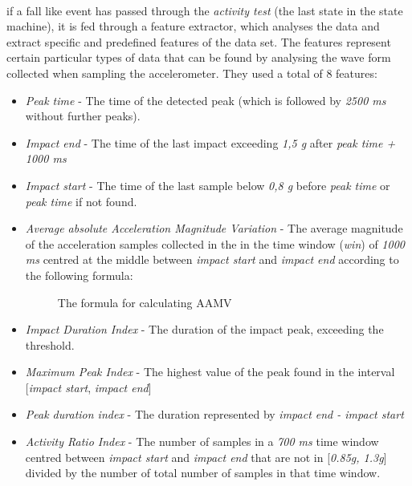 \documentclass[12pt, a4paper, onecolumn]{article}
\begin{document}
	
	
	\paragraph{} if a fall like event has passed through the  \textit{activity test} (the last state in the state machine), it is fed through a feature extractor, which analyses the data and extract specific and predefined features of the data set. The features represent certain particular types of data that can be found by analysing the wave form collected when sampling the accelerometer. They used a total of 8 features:
	
	\begin{itemize}
		\item \textit{Peak time} - The time of the detected peak (which is followed by \textit{2500 ms} without further peaks).
		\item \textit{Impact end} - The time of the last impact exceeding \textit{1,5 g} after \textit{peak time + 1000 ms}
		\item  \textit{Impact start} - The time of the last sample below \textit{0,8 g} before \textit{peak time} or \textit{peak time} if not found.
		
		\item \textit{Average absolute Acceleration Magnitude Variation} - The average magnitude of the acceleration samples collected in the in the time window (\textit{win}) of \textit{1000 ms} centred at the middle between \textit{impact start} and \textit{impact end} according to the following formula:
		
		
		\begin{figure}[h]
			\centering
			\caption{The formula for calculating AAMV \cite{piza_uni}}%
			\label{fig:example}%
		\end{figure}
		
		\item \textit{Impact Duration Index} - The duration of the impact peak, exceeding the threshold.
		\item \textit{Maximum Peak Index} - The highest value of the peak found in the interval [\textit{impact start}, \textit{impact end}]
		
		\item \textit{Peak duration index} - The duration represented by \textit{impact end - impact start}
		\item \textit{Activity Ratio Index} - The number of samples in a \textit{700 ms} time window centred between \textit{impact start} and \textit{impact end} that are not in [\textit{0.85g, 1.3g}] divided by the number of total number of samples in that time window.
		

\end{itemize}
\end{document}
